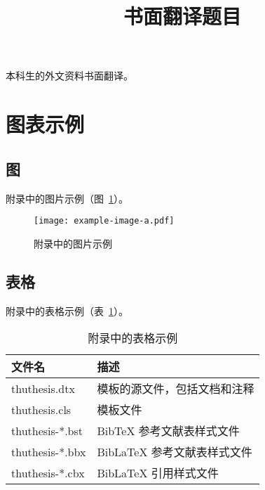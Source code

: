 
\begin{translation}
\label{cha:translation}

\title{书面翻译题目}
\maketitle

\tableofcontents


本科生的外文资料书面翻译。


\section{图表示例}

\subsection{图}

附录中的图片示例（图~\ref{fig:appendix-translation-figure}）。

\begin{figure}
  \centering
  \texttt{[image: example-image-a.pdf]}
  \caption{附录中的图片示例}
  \label{fig:appendix-translation-figure}
\end{figure}


\subsection{表格}

附录中的表格示例（表~\ref{tab:appendix-translation-table}）。

\begin{table}
  \centering
  \caption{附录中的表格示例}
  \begin{tabular}{ll}
    \toprule
    文件名          & 描述                         \\
    \midrule
    thuthesis.dtx   & 模板的源文件，包括文档和注释 \\
    thuthesis.cls   & 模板文件                     \\
    thuthesis-*.bst & BibTeX 参考文献表样式文件    \\
    thuthesis-*.bbx & BibLaTeX 参考文献表样式文件  \\
    thuthesis-*.cbx & BibLaTeX 引用样式文件        \\
    \bottomrule
  \end{tabular}
  \label{tab:appendix-translation-table}
\end{table}



\end{translation}
